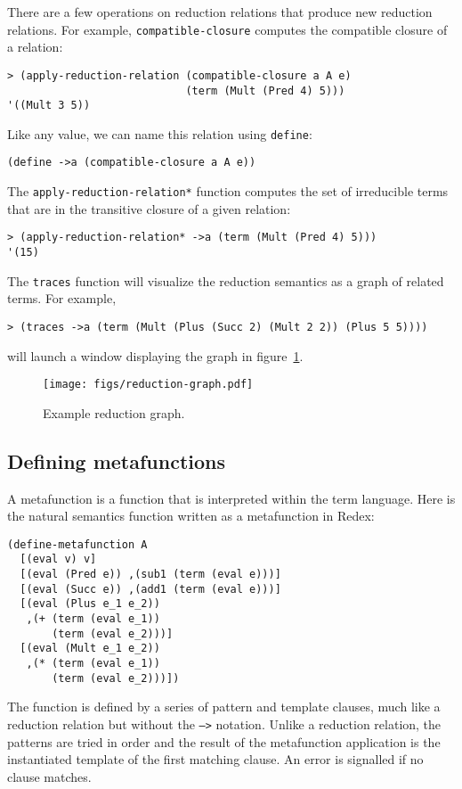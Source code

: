 There are a few operations on reduction relations that produce new
reduction relations.  For example, {\tt compatible-closure} computes
the compatible closure of a relation:
\begin{verbatim}
> (apply-reduction-relation (compatible-closure a A e)
                            (term (Mult (Pred 4) 5)))
'((Mult 3 5))
\end{verbatim}
Like any value, we can name this relation using {\tt define}:
\begin{verbatim}
(define ->a (compatible-closure a A e))
\end{verbatim}
The {\tt apply-reduction-relation*} function computes the set of
irreducible terms that are in the transitive closure of a given
relation:
\begin{verbatim}
> (apply-reduction-relation* ->a (term (Mult (Pred 4) 5)))
'(15)
\end{verbatim}

The {\tt traces} function will visualize the reduction semantics as a
graph of related terms.  For example,
\begin{verbatim}
> (traces ->a (term (Mult (Plus (Succ 2) (Mult 2 2)) (Plus 5 5))))
\end{verbatim}
will launch a window displaying the graph in figure~\ref{fig:graph}.
\begin{figure}
\begin{center}
\texttt{[image: figs/reduction-graph.pdf]}
\end{center}
\caption{Example reduction graph.}
\label{fig:graph}
\end{figure}


\subsection{Defining metafunctions}

A metafunction is a function that is interpreted within the term
language.  Here is the natural semantics function written as a
metafunction in Redex:
\begin{verbatim}
(define-metafunction A
  [(eval v) v]
  [(eval (Pred e)) ,(sub1 (term (eval e)))]
  [(eval (Succ e)) ,(add1 (term (eval e)))]
  [(eval (Plus e_1 e_2))
   ,(+ (term (eval e_1))
       (term (eval e_2)))]
  [(eval (Mult e_1 e_2))
   ,(* (term (eval e_1))
       (term (eval e_2)))])
\end{verbatim}

The function is defined by a series of pattern and template clauses,
much like a reduction relation but without the {\tt -->} notation.
Unlike a reduction relation, the patterns are tried in order and the
result of the metafunction application is the instantiated template of
the first matching clause.  An error is signalled if no clause
matches.

